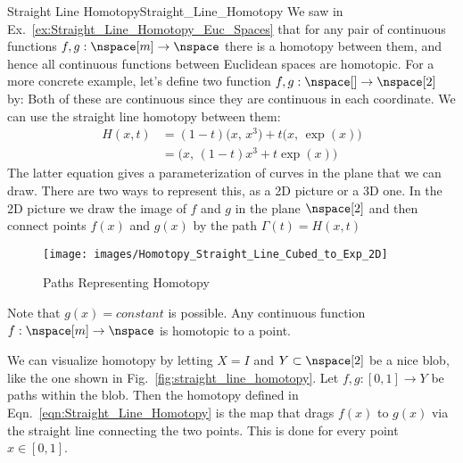 \documentclass{article}                                                        %
\begin{document}
        \begin{lexample}{Straight Line Homotopy}{Straight_Line_Homotopy}
            We saw in Ex.~\ref{ex:Straight_Line_Homotopy_Euc_Spaces} that for
            any pair of continuous functions $f,g:\nspace[m]\rightarrow\nspace$
            there is a homotopy between them, and hence all continuous functions
            between Euclidean spaces are homotopic. For a more concrete example,
            let's define two function $f,g:\nspace[]\rightarrow\nspace[2]$ by:
            Both of these are continuous since they are continuous in each
            coordinate. We can use the straight line homotopy between them:
            \begin{subequations}
                \begin{align}
                    H(x,t)&=(1-t)\big(x,\,x^{3}\big)+t\big(x,\,\exp(x)\big)\\
                          &=\big(x,\,(1-t)x^{3}+t\exp(x)\big)
                \end{align}
            \end{subequations}
            The latter equation gives a parameterization of curves in the plane
            that we can draw. There are two ways to represent this, as a 2D
            picture or a 3D one. In the 2D picture we draw the image of $f$ and
            $g$ in the plane $\nspace[2]$ and then connect points $f(x)$ and
            $g(x)$ by the path $\Gamma(t)=H(x,t)$
            \begin{figure}[H]
                \centering
                \captionsetup{type=figure}
                \texttt{[image: images/Homotopy\_Straight\_Line\_Cubed\_to\_Exp\_2D]}
                \caption{Paths Representing Homotopy}
                \label{fig:Paths_Representing_Homotopy}
            \end{figure}
            Note that $g(x)=constant$ is possible. Any continuous function
            $f:\nspace[m]\rightarrow\nspace$ is homotopic to a point.
        \end{lexample}
        We can visualize homotopy by letting $X=I$ and $Y\subset\nspace[2]$ be a
        nice blob, like the one shown in Fig.~\ref{fig:straight_line_homotopy}.
        Let $f,g:[0,1]\rightarrow Y$ be paths within the blob. Then the homotopy
        defined in Eqn.~\ref{eqn:Straight_Line_Homotopy} is the map that
        drags $f(x)$ to $g(x)$ via the straight line connecting the two points.
        This is done for every point $x\in [0,1]$.
\end{document}
